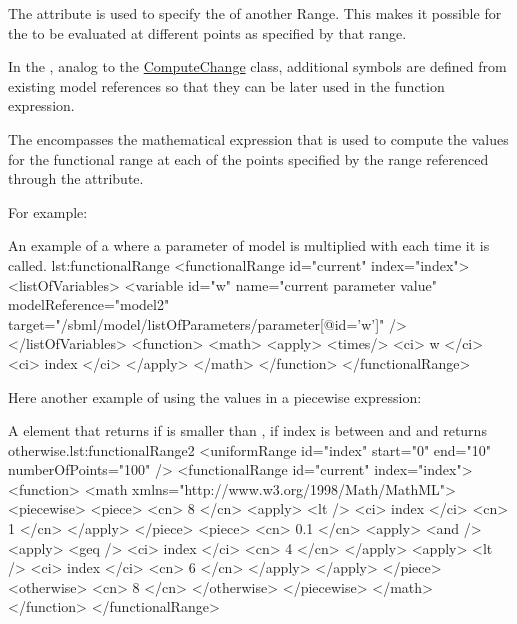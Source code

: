 The attribute  is used to specify the  of another Range. This makes it possible for the  to be evaluated at different points as specified by that range. 

In the , analog to the \hyperref[class:computeChange]{ComputeChange} class,  additional symbols are defined from existing model references so that they can be later used in the function expression. 

The  encompasses the mathematical expression that is used to compute the values for the functional range at each of the points specified by the range referenced through the  attribute. 

For example:

\begin{myXmlLst}{An example of a  where a parameter  of model  is multiplied with  each time it is called. }{lst:functionalRange}
    <functionalRange id="current" index="index"> 
      <listOfVariables> 
         <variable id="w" name="current parameter value"   
				                  modelReference="model2"
                          target="/sbml/model/listOfParameters/parameter[@id='w']" /> 
      </listOfVariables> 
      <function>
        <math> 
           <apply>
           <times/>
           <ci> w </ci> 
           <ci> index </ci> 
           </apply>
        </math>  
      </function>
    </functionalRange> 
\end{myXmlLst}

Here another example of using the values in a piecewise expression: 

\begin{myXmlLst}{A  element that returns  if 
   is smaller than ,  if index is between 
	 and  and returns  otherwise.}{lst:functionalRange2}
        <uniformRange id="index" start="0" end="10" numberOfPoints="100" />
        <functionalRange id="current" index="index">
          <function>
            <math xmlns="http://www.w3.org/1998/Math/MathML">
              <piecewise>
                <piece>
                  <cn> 8 </cn>
                  <apply>
                    <lt />
                    <ci> index </ci>
                    <cn> 1 </cn>
                  </apply>
                </piece>
                <piece>
                  <cn> 0.1 </cn>
                  <apply>
                    <and />
                    <apply>
                      <geq />
                      <ci> index </ci>
                      <cn> 4 </cn>
                    </apply>
                    <apply>
                      <lt />
                      <ci> index </ci>
                      <cn> 6 </cn>
                    </apply>
                  </apply>
                </piece>
                <otherwise>
                  <cn> 8 </cn>
                </otherwise>
              </piecewise>
            </math>
          </function>
        </functionalRange>
\end{myXmlLst}




